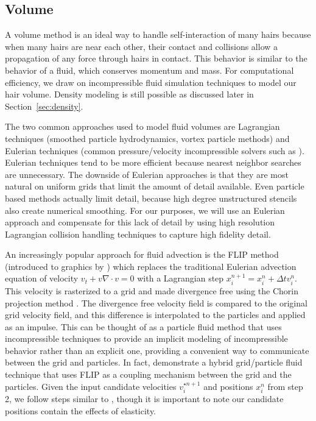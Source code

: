 \subsection{Volume}
\label{sec:volume}

A volume method is an ideal way to handle self-interaction of many hairs because
when many hairs are near each other, their contact and collisions allow a
propagation of any force through hairs in contact.  This behavior is similar to
the behavior of a fluid, which conserves momentum and mass. For
computational efficiency, we draw on incompressible fluid simulation
techniques to model our hair volume.  Density modeling is still
possible as discussed later in Section~\ref{sec:density}.


The two common approaches used to model fluid volumes are Lagrangian
techniques (smoothed particle hydrodynamics, vortex particle methods)
and Eulerian techniques (common pressure/velocity incompressible
solvers such as \cite{Stam:1999:SF}). Eulerian techniques tend to be more efficient because 
nearest neighbor
searches are unnecessary.  The downside of Eulerian approaches is that
they are most natural on uniform grids that limit the amount of detail
available. Even particle based methods actually limit detail, because high
degree unstructured stencils also create numerical smoothing. For our purposes,
we will use an Eulerian approach and compensate for this lack of
detail by using high resolution Lagrangian collision handling techniques to
capture high fidelity detail.

An increasingly popular approach for fluid advection is the FLIP method
(introduced to graphics by \cite{zhu:2005:sand}) which replaces the traditional
Eulerian advection equation of velocity $v_t+v \nabla\cdot v=0$ with a
Lagrangian step $x_i^{n+1}=x_i^n+\Delta t v^n_i$. This velocity is
rasterized to a grid and made divergence free using the Chorin
projection method \cite{chorin:1967:ANM}. The divergence free velocity field is compared to the
original grid velocity field, and this difference is interpolated to the
particles and applied as an impulse.  This can be thought of as a
particle fluid method
that uses incompressible techniques to provide an implicit modeling of
incompressible behavior rather than an explicit one,
providing a convenient way to
communicate between the grid and particles. In fact, \cite{losasso:2007:sph}
demonstrate a hybrid grid/particle fluid technique that uses FLIP as a coupling
mechanism between the grid and the particles. Given the input candidate velocities $v^{\star n+1}_i
$ and positions
$x^n_i$ from step 2, we follow steps similar to \cite{losasso:2007:sph},
though it is important to note our candidate positions contain the effects of
elasticity. 

